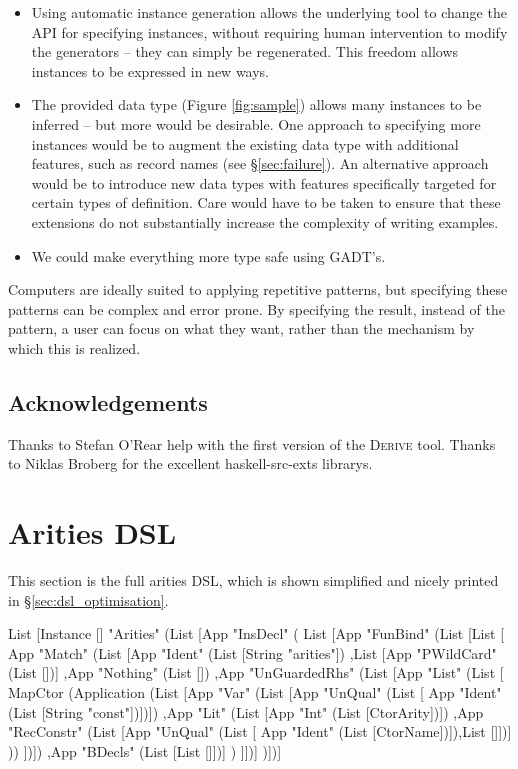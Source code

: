 \documentclass[preprint,draft]{sigplanconf}
\newcommand{\derive}{\textsc{Derive}}
\begin{document}
\begin{itemize}
\item Using automatic instance generation allows the underlying tool to change the API for specifying instances, without requiring human intervention to modify the generators -- they can simply be regenerated. This freedom allows instances to be expressed in new ways.
\item The provided data type (Figure \ref{fig:sample}) allows many instances to be inferred -- but more would be desirable. One approach to specifying more instances would be to augment the existing data type with additional features, such as record names (see \S\ref{sec:failure}). An alternative approach would be to introduce new data types with features specifically targeted for certain types of definition. Care would have to be taken to ensure that these extensions do not substantially increase the complexity of writing examples.
\item We could make everything more type safe using GADT's.
\end{itemize}

Computers are ideally suited to applying repetitive patterns, but specifying these patterns can be complex and error prone. By specifying the result, instead of the pattern, a user can focus on what they want, rather than the mechanism by which this is realized.

\subsection*{Acknowledgements}

Thanks to Stefan O'Rear help with the first version of the \derive{} tool. Thanks to Niklas Broberg for the excellent haskell-src-exts librarys.


\appendix

\section{Arities DSL}
\label{sec:arities_full}

This section is the full arities DSL, which is shown simplified and nicely printed in \S\ref{sec:dsl_optimisation}.

\begin{code}
List [Instance [] "Arities" (List [App "InsDecl" (
    List [App "FunBind" (List [List [
        App "Match" (List
            [App "Ident" (List [String "arities"])
            ,List [App "PWildCard" (List [])]
            ,App "Nothing" (List [])
            ,App "UnGuardedRhs" (List [App "List" (List [
                MapCtor (Application (List
                    [App "Var" (List [App "UnQual" (List [
                        App "Ident" (List [String "const"])])])
                    ,App "Lit" (List [App "Int" (List [CtorArity])])
                    ,App "RecConstr" (List [App "UnQual" (List [
                        App "Ident" (List [CtorName])]),List []])]
                ))
            ])])
            ,App "BDecls" (List [List []])]
        )
    ]])]
)])]
\end{code}



\end{document}
